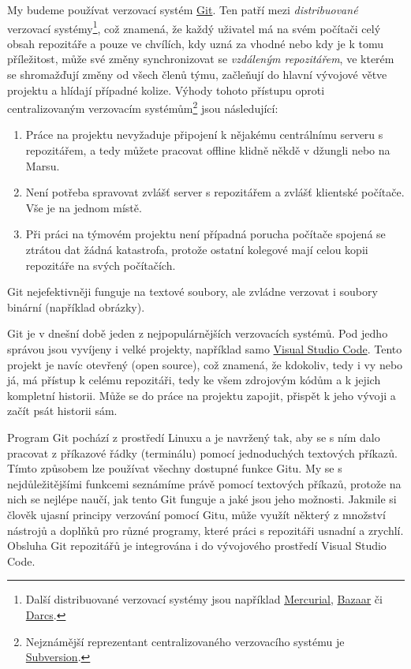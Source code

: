 \documentclass[a4paper,11pt,twoside]{article}
\theoremstyle{red}
\theoremstyle{green}
\begin{document}
    My budeme používat verzovací systém \href{https://git-scm.com}{Git}.
    Ten patří mezi \emph{distribuované} verzovací systémy\footnote{
        Další distribuované verzovací systémy jsou například \href{https://www.mercurial-scm.org/}{Mercurial}, \href{https://bazaar.canonical.com}{Bazaar} či \href{http://darcs.net/}{Darcs}.
    }, což znamená, že každý uživatel má na svém počítači celý obsah repozitáře a pouze ve chvílích, kdy uzná za vhodné nebo kdy je k tomu příležitost, může své změny synchronizovat se \emph{vzdáleným repozitářem}, ve kterém se shromažďují změny od všech členů týmu, začleňují do hlavní vývojové větve projektu a hlídají případné kolize.
    Výhody tohoto přístupu oproti centralizovaným verzovacím systémům\footnote{
        Nejznámější reprezentant centralizovaného verzovacího systému je \href{https://subversion.apache.org/}{Subversion}.
    } jsou následující:
    \begin{enumerate}
        \item Práce na projektu nevyžaduje připojení k nějakému centrálnímu serveru s repozitářem, a tedy můžete pracovat offline klidně někdě v džungli nebo na Marsu.
        \item Není potřeba spravovat zvlášť server s repozitářem a zvlášť klientské počítače. Vše je na jednom místě.
        \item Při práci na týmovém projektu není případná porucha počítače spojená se ztrátou dat žádná katastrofa, protože ostatní kolegové mají celou kopii repozitáře na svých počítačích.
    \end{enumerate}
    Git nejefektivněji funguje na textové soubory, ale zvládne verzovat i soubory binární (například obrázky).

    Git je v dnešní době jeden z nejpopulárnějších verzovacích systémů.
    Pod jedho správou jsou vyvíjeny i velké projekty, například samo \href{https://github.com/microsoft/vscode}{Visual Studio Code}.
    Tento projekt je navíc otevřený (open source), což znamená, že kdokoliv, tedy i vy nebo já, má přístup k celému repozitáři, tedy ke všem zdrojovým kódům a k jejich kompletní historii. 
    Může se do práce na projektu zapojit, přispět k jeho vývoji a začít psát historii sám.
    
    Program Git pochází z prostředí Linuxu a je navržený tak, aby se s ním dalo pracovat z příkazové řádky (terminálu) pomocí jednoduchých textových příkazů.
    Tímto způsobem lze používat všechny dostupné funkce Gitu.
    My se s nejdůležitějšími funkcemi seznámíme právě pomocí textových příkazů, protože na nich se nejlépe naučí, jak tento Git funguje a jaké jsou jeho možnosti.
    Jakmile si člověk ujasní principy verzování pomocí Gitu, může využít některý z množství nástrojů a doplňků pro různé programy, které práci s repozitáři usnadní a zrychlí.
    Obsluha Git repozitářů je integrována i do vývojového prostředí Visual Studio Code.
\end{document}
